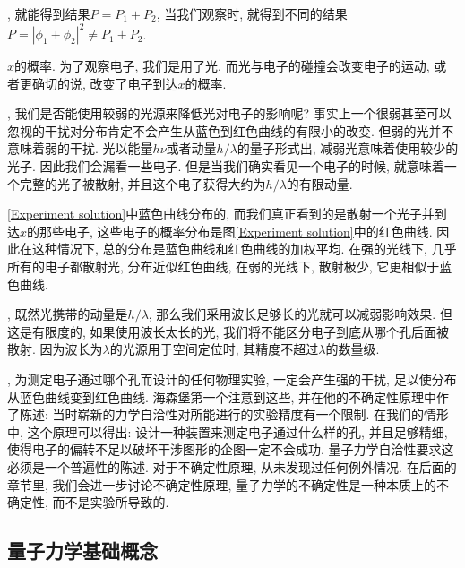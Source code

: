 \documentclass[a4paper,11pt]{article}
\theoremstyle{mystyle}
\begin{document}
, 就能得到结果$P=P_1+P_2$, 当我们观察时, 就得到不同的结果$P=|\phi_1+\phi_2|^2\neq P_1+P_2$.

$x$的概率. 为了观察电子, 我们是用了光, 而光与电子的碰撞会改变电子的运动, 或者更确切的说, 改变了电子到达$x$的概率.

, 我们是否能使用较弱的光源来降低光对电子的影响呢? 事实上一个很弱甚至可以忽视的干扰对分布肯定不会产生从蓝色到红色曲线的有限小的改变. 但弱的光并不意味着弱的干扰. 光以能量$h\nu$或者动量$h/\lambda$的量子形式出, 减弱光意味着使用较少的光子. 因此我们会漏看一些电子. 但是当我们确实看见一个电子的时候, 就意味着一个完整的光子被散射, 并且这个电子获得大约为$h/\lambda$的有限动量.

\ref{Experiment solution}中蓝色曲线分布的, 而我们真正看到的是散射一个光子并到达$x$的那些电子, 这些电子的概率分布是图\ref{Experiment solution}中的红色曲线. 因此在这种情况下, 总的分布是蓝色曲线和红色曲线的加权平均. 在强的光线下, 几乎所有的电子都散射光, 分布近似红色曲线, 在弱的光线下, 散射极少, 它更相似于蓝色曲线.

, 既然光携带的动量是$h/\lambda$, 那么我们采用波长足够长的光就可以减弱影响效果. 但这是有限度的, 如果使用波长太长的光, 我们将不能区分电子到底从哪个孔后面被散射. 因为波长为$\lambda$的光源用于空间定位时, 其精度不超过$\lambda$的数量级.

, 为测定电子通过哪个孔而设计的任何物理实验, 一定会产生强的干扰, 足以使分布从蓝色曲线变到红色曲线. 海森堡第一个注意到这些, 并在他的不确定性原理中作了陈述: 当时崭新的力学自洽性对所能进行的实验精度有一个限制. 在我们的情形中, 这个原理可以得出: 设计一种装置来测定电子通过什么样的孔, 并且足够精细, 使得电子的偏转不足以破坏干涉图形的企图一定不会成功. 量子力学自洽性要求这必须是一个普遍性的陈述. 对于不确定性原理, 从未发现过任何例外情况. 在后面的章节里, 我们会进一步讨论不确定性原理, 量子力学的不确定性是一种本质上的不确定性, 而不是实验所导致的.


\subsection{量子力学基础概念}
\end{document}

